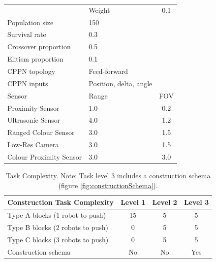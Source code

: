 \documentclass[conference]{IEEEtran}
\begin{document}
\begin{table}
\begin{tabular}{llc}
		& Weight                                               & 0.1  \\
		Population size                                        & 150 \\
		Survival rate                                          & 0.3 \\
		Crossover proportion                                   & 0.5 \\
		Elitism proportion                                     & 0.1 \\
		CPPN topology                                          & Feed-forward           \\
		CPPN inputs                                            & Position, delta, angle \\
		\hline
		Sensor                                                 & Range     & FOV \\
		\hline
		Proximity Sensor		                               & 	1.0	   &  0.2  \\
		Ultrasonic Sensor		                               &	4.0    &  1.2  \\
		Ranged Colour Sensor	                               &	3.0	   &  1.5 \\
		Low-Res Camera			                               & 	3.0	   &  1.5 \\
		Colour Proximity Sensor                                & 	3.0	   &  3.0 \\
		\hline
	\end{tabular}
\end{table}

\begin{table}[t]
	\renewcommand{\arraystretch}{1.30}
	\caption{Task Complexity. Note: Task level 3 includes a construction schema (figure \ref{fig:constructionSchema}).}\label{tab:taskComplexity}
	\centering
	\begin{tabular}{lccc}
		\hline
		Construction Task Complexity                               & Level 1     & Level 2    & Level 3   \\
		\hline
		Type A blocks (1 robot to push)	                           & 	15	     & 5          & 5  \\
		Type B blocks (2 robots to push)		                   &	0 	     & 5          & 5  \\
		Type C blocks (3 robots to push)	                       &  	0	     & 5          & 5  \\
		Construction schema                                        &   No        & No         &	Yes \\
\hline
	\end{tabular}
\end{table}
\end{document}
